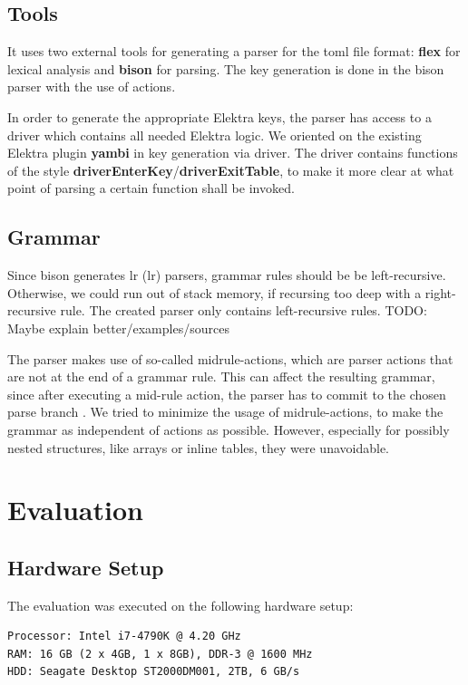 \documentclass[12pt]{report}
\begin{document}
\section{Tools}
It uses two external tools for generating a parser for the toml file format: \textbf{\acrshort{flex}} \cite{flexgit} for lexical analysis and \textbf{bison} \cite{bisonmain} for parsing.
The key generation is done in the bison parser with the use of actions.

In order to generate the appropriate Elektra keys, the parser has access to a driver which contains all needed Elektra logic.
We oriented on the existing Elektra plugin \textbf{yambi}\cite{Elektrayambi} in key generation via driver.
The driver contains functions of the style \textbf{driverEnterKey}/\textbf{driverExitTable}, to make it more clear at what point of parsing a certain function shall be invoked.

\section{Grammar}
Since bison generates \acrshort{lr} (\acrlong{lr}) parsers, grammar rules should be be left-recursive.
Otherwise, we could run out of stack memory, if recursing too deep with a right-recursive rule.
The created parser only contains left-recursive rules.
TODO: Maybe explain better/examples/sources

The parser makes use of so-called midrule-actions, which are parser actions that are not at the end of a grammar rule.
This can affect the resulting grammar, since after executing a mid-rule action, the parser has to commit to the chosen parse branch \cite{bisonmidruleconflicts}.
We tried to minimize the usage of midrule-actions, to make the grammar as independent of actions as possible.
However, especially for possibly nested structures, like arrays or inline tables, they were unavoidable.

\chapter{Evaluation}

\section{Hardware Setup}
The evaluation was executed on the following hardware setup:
\begin{verbatim}
Processor: Intel i7-4790K @ 4.20 GHz
RAM: 16 GB (2 x 4GB, 1 x 8GB), DDR-3 @ 1600 MHz 
HDD: Seagate Desktop ST2000DM001, 2TB, 6 GB/s
\end{verbatim}
\end{document}
